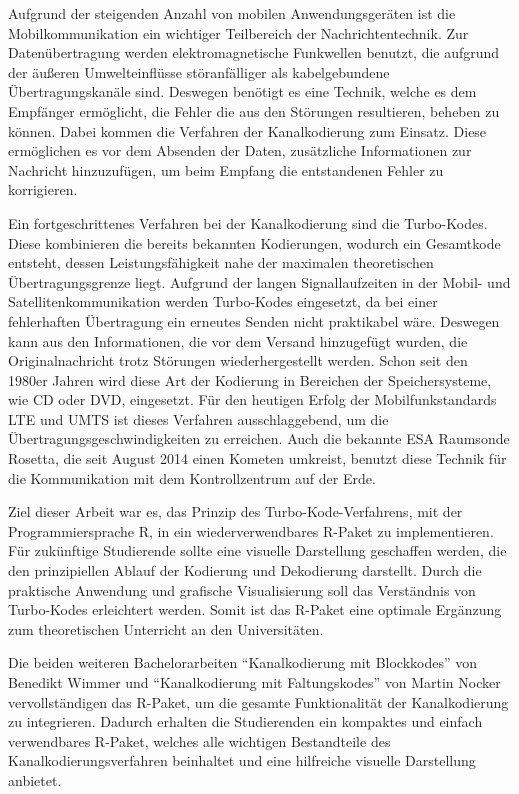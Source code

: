 Aufgrund der steigenden Anzahl von mobilen Anwendungsgeräten ist die Mobilkommunikation ein wichtiger Teilbereich der Nachrichtentechnik. Zur Datenübertragung werden elektromagnetische Funkwellen benutzt, die aufgrund der äußeren Umwelteinflüsse störanfälliger als kabelgebundene Übertragungskanäle sind. Deswegen benötigt es eine Technik, welche es dem Empfänger ermöglicht, die Fehler die aus den Störungen resultieren, beheben zu können. Dabei kommen die Verfahren der Kanalkodierung zum Einsatz. Diese ermöglichen es vor dem Absenden der Daten, zusätzliche Informationen zur Nachricht hinzuzufügen, um beim Empfang die entstandenen Fehler zu korrigieren.

Ein fortgeschrittenes Verfahren bei der Kanalkodierung sind die Turbo-Kodes. Diese kombinieren die bereits bekannten Kodierungen, wodurch ein Gesamtkode entsteht, dessen Leistungsfähigkeit nahe der maximalen theoretischen Übertragungsgrenze liegt. Aufgrund der langen Signallaufzeiten in der Mobil- und Satellitenkommunikation werden Turbo-Kodes eingesetzt, da bei einer fehlerhaften Übertragung ein erneutes Senden nicht praktikabel wäre. Deswegen kann aus den Informationen, die vor dem Versand hinzugefügt wurden, die Originalnachricht trotz Störungen wiederhergestellt werden. Schon seit den 1980er Jahren wird diese Art der Kodierung in Bereichen der Speichersysteme, wie CD oder DVD, eingesetzt. Für den heutigen Erfolg der Mobilfunkstandards LTE und UMTS ist dieses Verfahren ausschlaggebend, um die Übertragungsgeschwindigkeiten zu erreichen. Auch die bekannte ESA Raumsonde Rosetta, die seit August 2014 einen Kometen umkreist, benutzt diese Technik für die Kommunikation mit dem Kontrollzentrum auf der Erde.~\cite[S.~242~f.]{schoenfeld2012informations} 

Ziel dieser Arbeit war es, das Prinzip des Turbo-Kode-Verfahrens, mit der Programmiersprache R, in ein wiederverwendbares R-Paket zu implementieren. Für zukünftige Studierende sollte eine visuelle Darstellung geschaffen werden, die den prinzipiellen Ablauf der Kodierung und Dekodierung darstellt. Durch die praktische Anwendung und grafische Visualisierung soll das Verständnis von Turbo-Kodes erleichtert werden. Somit ist das R-Paket eine optimale Ergänzung zum theoretischen Unterricht an den Universitäten.

Die beiden weiteren Bachelorarbeiten \enquote{Kanalkodierung mit Blockkodes} von Benedikt Wimmer \cite{wimmer} und \enquote{Kanalkodierung mit Faltungskodes} von Martin Nocker \cite{nocker} vervollständigen das R-Paket, um die gesamte Funktionalität der Kanalkodierung zu integrieren. Dadurch erhalten die Studierenden ein kompaktes und einfach verwendbares R-Paket, welches alle wichtigen Bestandteile des Kanalkodierungsverfahren beinhaltet und eine hilfreiche visuelle Darstellung anbietet.   

